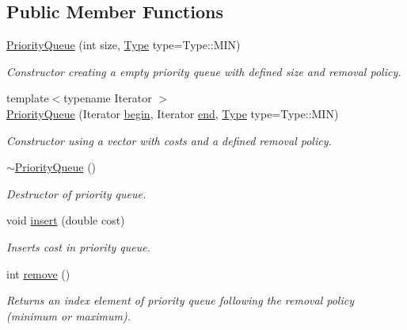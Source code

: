 \subsection*{Public Member Functions}
\begin{DoxyCompactItemize}
\item 
\hyperlink{classPriorityQueue_ab2db14880bcb6c0b3717c574e0c34557}{Priority\+Queue} (int size, \hyperlink{classPriorityQueue_a5d63bb7f1eeef31a80cdff9f280f081a}{Type} type=Type\+::\+M\+I\+N)
\begin{DoxyCompactList}\small\item\em Constructor creating a empty priority queue with defined size and removal policy. \end{DoxyCompactList}\item 
{\footnotesize template$<$typename Iterator $>$ }\\\hyperlink{classPriorityQueue_aad8fdab799e19cb8dd88e90d74bd6545}{Priority\+Queue} (Iterator \hyperlink{classPriorityQueue_a06ca073a126211e579a87445edf5a24f}{begin}, Iterator \hyperlink{classPriorityQueue_a4f9007e581cec086c48a634e07855760}{end}, \hyperlink{classPriorityQueue_a5d63bb7f1eeef31a80cdff9f280f081a}{Type} type=Type\+::\+M\+I\+N)
\begin{DoxyCompactList}\small\item\em Constructor using a vector with costs and a defined removal policy. \end{DoxyCompactList}\item 
\hyperlink{classPriorityQueue_a69b8f6b5ad108e9db66ac4db46c628d7}{$\sim$\+Priority\+Queue} ()
\begin{DoxyCompactList}\small\item\em Destructor of priority queue. \end{DoxyCompactList}\item 
void \hyperlink{classPriorityQueue_aefe65208603d5a5f0692722087700ebd}{insert} (double cost)
\begin{DoxyCompactList}\small\item\em Inserts cost in priority queue. \end{DoxyCompactList}\item 
int \hyperlink{classPriorityQueue_a02b033eeb3cd8a760496a1c269ec4855}{remove} ()
\begin{DoxyCompactList}\small\item\em Returns an index element of priority queue following the removal policy (minimum or maximum). \end{DoxyCompactList}\item 

\end{DoxyCompactItemize}
